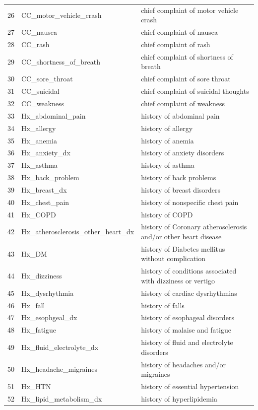 \begin{longtable}{@{\extracolsep{\fill}}lll}
26 & CC\_motor\_vehicle\_crash & chief complaint of motor vehicle crash \\
27 & CC\_nausea & chief complaint of nausea \\
28 & CC\_rash & chief complaint of rash \\
29 & CC\_shortness\_of\_breath & chief complaint of shortness of breath \\
30 & CC\_sore\_throat & chief complaint of sore throat \\
31 & CC\_suicidal & chief complaint of suicidal thoughts \\
32 & CC\_weakness & chief complaint of weakness \\
33 & Hx\_abdominal\_pain & history of abdominal pain \\
34 & Hx\_allergy & history of allergy \\
35 & Hx\_anemia & history of anemia \\
36 & Hx\_anxiety\_dx & history of anxiety disorders \\
37 & Hx\_asthma & history of asthma \\
38 & Hx\_back\_problem & history of back problems \\
39 & Hx\_breast\_dx & history of breast disorders \\
40 & Hx\_chest\_pain & history of nonspecific chest pain \\
41 & Hx\_COPD & history of COPD \\
42 & Hx\_atherosclerosis\_other\_heart\_dx & history of Coronary atherosclerosis and/or other heart disease \\
43 & Hx\_DM & history of Diabetes mellitus without complication \\
44 & Hx\_dizziness & history of conditions associated with dizziness or vertigo \\
45 & Hx\_dysrhythmia & history of cardiac dysrhythmias \\
46 & Hx\_fall & history of falls \\
47 & Hx\_esophgeal\_dx & history of esophageal disorders \\
48 & Hx\_fatigue & history of malaise and fatigue \\
49 & Hx\_fluid\_electrolyte\_dx & history of fluid and electrolyte disorders \\
50 & Hx\_headache\_migraines & history of headaches and/or migraines \\
51 & Hx\_HTN & history of essential hypertension \\
52 & Hx\_lipid\_metabolism\_dx & history of hyperlipidemia \\

\end{longtable}
